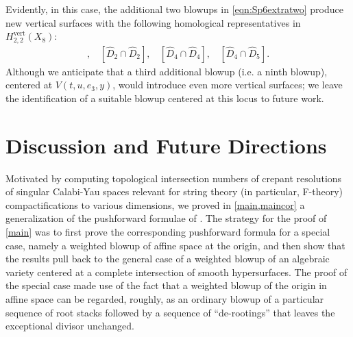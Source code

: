 \documentclass[11pt,oneside,english]{article}
\numberwithin{equation}{section}
\theoremstyle{definition}
\begin{document}
Evidently, in this case, the additional two blowups in \cref{eqn:Sp6extratwo} produce new vertical surfaces with the following homological representatives in $H_{2,2}^{\text{vert}}(X_8)$:
	\begin{align}
		[\hat D_1 \cap \hat D_2],~~~~ [\hat D_2 \cap \hat D_2],~~~~ [ \hat D_4 \cap \hat D_4],~~~~[ \hat D_4 \cap \hat D_5]. 
	\end{align}
Although we anticipate that a third additional blowup (i.e. a ninth blowup), centered at $V( t , u ,e_3 , y)$, would introduce even more vertical surfaces; we leave the identification of a suitable blowup centered at this locus to future work.

\section{Discussion and Future Directions}

Motivated by computing topological intersection numbers of crepant resolutions of singular Calabi-Yau spaces relevant for string theory (in particular, F-theory) compactifications to various dimensions, we proved in \cref{main,maincor} a generalization of the pushforward formulae of \cite{Fullwood:2012kj,Esole:2017kyr}. The strategy for the proof of \cref{main} was to first prove the corresponding pushforward formula for a special case, namely a weighted blowup of affine space at the origin, and then show that the results pull back to the general case of a weighted blowup of an algebraic variety centered at a complete intersection of smooth hypersurfaces. The proof of the special case made use of the fact \cite{weighted} that a weighted blowup of the origin in affine space can be regarded, roughly, as an ordinary blowup of a particular sequence of root stacks followed by a sequence of ``de-rootings'' that leaves the exceptional divisor unchanged. 
\end{document}
